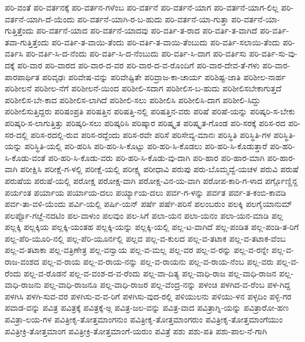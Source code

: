 ಪರಿ-ವಂತೆ
ಪರಿ-ವರ್ತನಕ್ಕೆ
ಪರಿ-ವರ್ತನ-ಗಳೆಂಬ
ಪರಿ-ವರ್ತನೆ
ಪರಿ-ವರ್ತನೆ-ಯಾಗ
ಪರಿ-ವರ್ತನೆ-ಯಾಗ-ಲಿಲ್ಲ
ಪರಿ-ವರ್ತನೆ-ಯಾಗಿ-ದೆ-ಯೆಂದು
ಪರಿ-ವರ್ತನೆ-ಯಾಗಿ-ರ-ಬ-ಹುದು
ಪರಿ-ವರ್ತನೆ-ಯಾ-ಗುತ್ತಾ
ಪರಿ-ವರ್ತನೆ-ಯಾ-ಗುತ್ತಿತ್ತೆಂದು
ಪರಿ-ವರ್ತನೆ-ಯಾದ
ಪರಿ-ವರ್ತನೆ-ಯಾದವು
ಪರಿ-ವರ್ತಿ-ತ-ರಾದ
ಪರಿ-ವರ್ತಿ-ತ-ವಾಗಿದೆ
ಪರಿ-ವರ್ತಿ-ತವಾ-ಗುತ್ತಿತ್ತೆಂದು
ಪರಿ-ವರ್ತಿ-ತ-ವಾಯಿ-ತೆಂದು
ಪರಿ-ವರ್ತಿ-ತ-ವಾಯಿ-ತೆಂಬುದು
ಪರಿ-ವರ್ತಿ-ಸಲಾಯಿ-ತೆಂದು
ಪರಿ-ವರ್ತಿಸಿ
ಪರಿ-ವರ್ತಿ-ಸಿ-ದ-ನೆಂದು
ಪರಿ-ವರ್ತಿ-ಸಿ-ದ-ನೆಂಬುದು
ಪರಿ-ವರ್ತಿ-ಸಿ-ದಾಗ
ಪರಿ-ವರ್ತಿಸು
ಪರಿ-ವರ್ತಿ-ಸು-ವು-ದಕ್ಕೆ
ಪರಿ-ವಾರ
ಪರಿ-ವಾರದ
ಪರಿ-ವಾರ-ದ-ವರ
ಪರಿ-ವಾರ-ದ-ವ-ರೊಂದಿಗೆ
ಪರಿ-ವಾರ-ದೇವ-ತೆ-ಗಳು
ಪರಿ-ವಾರ-ಪಾರಪಾರ್ಥಿತ
ಪರಿವೃಢಃ
ಪರಿವೇಷ-ವನ್ನು
ಪರಿವೇಷ್ಟಿತೇ
ಪರಿವ್ರಾಜ-ಕಾ-ಚಾರ್ಯ
ಪರಿಶಿಷ್ಟ-ಜಾತಿ
ಪರಿಶೀಲ-ನಾರ್ಹ
ಪರಿಶೀಲನೆ
ಪರಿಶೀಲ-ನೆಗೆ
ಪರಿಶೀಲನೆ-ಯಿಂದ
ಪರಿಶೀಲಿ-ಸದಾಗ
ಪರಿಶೀಲಿಸ-ಬ-ಹುದು
ಪರಿಶೀಲಿಸಬೇಕಾಗುತ್ತದೆ
ಪರಿಶೀಲಿಸ-ಬೇ-ಕಾದ
ಪರಿಶೀಲಿಸ-ಲಾಗಿದೆ
ಪರಿಶೀಲಿ-ಸಲು
ಪರಿಶೀಲಿಸಿ
ಪರಿಶೀಲಿಸಿ-ದಾಗ
ಪರಿಶೀಲಿ-ಸಿದ್ದು
ಪರಿಶೀಲಿಸುತ್ತಿದ್ದರು
ಪರಿಷಂಪ್ರತಿ
ಪರಿಷತ್ತಿನ
ಪರಿಷತ್ತಿ-ನಲ್ಲಿ
ಪರಿಷತ್ತಿನ-ವರು
ಪರಿಷೆ
ಪರಿಷೆ-ಯನ್ನು
ಪರಿಷ್ಕರಿ-ಸ-ಬೇಕು
ಪರಿಷ್ಕರಿ-ಸ-ಲಾಗುತ್ತಿತ್ತು
ಪರಿಷ್ಕರಿ-ಸಲು
ಪರಿಷ್ಕರಿಸಿ
ಪರಿಷ್ಕಾರ
ಪರಿಷ್ಕೃತ
ಪರಿಷ್ಕೃತ-ಗೊಂಡ
ಪರಿ-ಸರಕ್ಕೆ
ಪರಿಸ-ರದ
ಪರಿ-ಸರ-ದಲ್ಲಿ
ಪರಿಸ-ರದಲ್ಲಿ-ರುವ
ಪರಿಸ-ರದ್ದೆಂದು
ಪರಿಸ-ರವೇ
ಪರಿಸೆ
ಪರಿಸೇವ್ಯ-ಮಾನಃ
ಪರಿಸ್ಥಿತಿ
ಪರಿಸ್ಥಿತಿ-ಗಳ
ಪರಿಸ್ಥಿತಿ-ಯನ್ನು
ಪರಿಸ್ಥಿತಿ-ಯಲ್ಲಿ
ಪರಿ-ಹರಿಸಿ
ಪರಿ-ಹರಿ-ಸಿ-ಕೊಟ್ಟು
ಪರಿ-ಹರಿ-ಸಿ-ಕೊಡಲು
ಪರಿ-ಹರಿ-ಸಿ-ಕೊಡುತ್ತಾರೆ
ಪರಿ-ಹರಿ-ಸಿ-ಕೊಡು-ವಂತೆ
ಪರಿ-ಹರಿ-ಸಿ-ಕೊಡು-ವರು
ಪರಿ-ಹರಿ-ಸಿ-ಕೊಡು-ವು-ದಾಗಿ
ಪರಿ-ಹಾರ
ಪರಿ-ಹಾರ-ಮಾಗಿ
ಪರಿ-ಹಾರ-ವಾಗಿ
ಪರೀಕ್ಷಿಸಿ
ಪರೀಕ್ಷೆ-ಗ-ಳಲ್ಲಿ
ಪರೀಕ್ಷೆ-ಯಲ್ಲಿ
ಪರೀಕ್ಷ್ಯ
ಪರೀಧಾವಿ
ಪರುಪು
ಪರು-ಬೊಮ್ಮವ್ವೆ-ಯಚಳ
ಪರುವಿ
ಪರುಷೆ
ಪರುಷೆಯ
ಪರುಷೆ-ಯಲ್ಲಿ
ಪರೋಕ್ಷ
ಪರೋಕ್ಷ-ವಾಗಿ
ಪರೋಕ್ಷ-ವಿನ-ಯ-ವಾಗಿ
ಪರೋಪ-ಕಾರಿ-ಗ-ಳಾದ
ಪರ್ಗ್ಗೊಣ್ಣಿನ್ದ
ಪರ್ಯಂತ
ಪರ್ಯಾಯ
ಪರ್ಯಾಯ-ದಲು
ಪರ್ಯ್ಯಾಯ-ದಲು
ಪರ್ವ-ಗ-ಳನ್ನು
ಪರ್ವತ
ಪರ್ವ-ತ-ಕಂಬಿ-ಕಾವಡಿ
ಪರ್ವ-ತಾ-ವಳಿ-ಯೆಂದು
ಪರ್ವಿ-ಯಲ್ಲಿ
ಪರ್ಷಿ-ಯನ್
ಪರ್ಷೆ
ಪರ್ಷೆ-ಪರಿಸೆ
ಪಲಂಬರುಂ
ಪಲಕ್ಕಿ
ಪಲಗೈಯಾನುಮ್
ಪಲರ್ಪ್ಪೊ-ಗೞ್ದೆ-ನದಟಿಂ
ಪಲ-ವಾಳುಂ
ಪಲವುಂ
ಪಲ-ಸಿಗೆ
ಪಲಾ-ಯನ
ಪಲಾ-ಯನಂ
ಪಲಾ-ಯನ-ಮಾಡಿ
ಪಲ್ಲ
ಪಲ್ಲಕ್ಕಿ
ಪಲ್ಲಕ್ಕಿಯ
ಪಲ್ಲಕ್ಕಿ-ಯಂತಹ
ಪಲ್ಲಕ್ಕಿ-ಯನ್ನು
ಪಲ್ಲಕ್ಕಿ-ಯಲ್ಲಿ
ಪಲ್ಲ-ಟ-ವಾಗಿದೆ
ಪಲ್ಲ-ಪಂಡಿತ
ಪಲ್ಲ-ಪಂಡಿ-ತ-ರಿಗೆ
ಪಲ್ಲ-ಪೆರಿ-ಯೂರಿ-ನಲ್ಲಿ
ಪಲ್ಲ-ಪೆರಿ-ಯೂರ್ನಲ್ಲಿ
ಪಲ್ಲವ
ಪಲ್ಲ-ವ-ಕುಲದ
ಪಲ್ಲ-ವ-ತಟಾಕ
ಪಲ್ಲ-ವ-ತಟಾಕ-ವೆಂಬ
ಪಲ್ಲ-ವ-ತಟಾಕಾ
ಪಲ್ಲ-ವತ್ರಿಣೇತ್ರ
ಪಲ್ಲ-ವನ್ವಾಯ
ಪಲ್ಲ-ವ-ಮಲ್ಲ
ಪಲ್ಲ-ವರ
ಪಲ್ಲ-ವ-ರನ್ನು
ಪಲ್ಲ-ವ-ರನ್ನೇ
ಪಲ್ಲ-ವ-ರಾಜ-ವಂಶದ
ಪಲ್ಲ-ವ-ರಾಯ
ಪಲ್ಲ-ವ-ರಾಯ-ನನ್ನು
ಪಲ್ಲ-ವ-ರಾಯನು
ಪಲ್ಲ-ವ-ರಾಯ-ನೆಂಬ
ಪಲ್ಲ-ವರು
ಪಲ್ಲ-ವ-ರೆಂದು
ಪಲ್ಲ-ವ-ರೊಡನೆ
ಪಲ್ಲ-ವ-ವಂಶ-ದ-ವ-ರೆಂದು
ಪಲ್ಲ-ವಾ-ದಿತ್ಯ
ಪಲ್ಲ-ವಾಧಿ-ರಾಜ
ಪಲ್ಲ-ವಾಧಿ-ರಾಜನ
ಪಲ್ಲ-ವಾಧಿ-ರಾಜನು
ಪಲ್ಲ-ವಾಧಿ-ರಾಜನೂ
ಪಲ್ಲ-ವಾಧಿ-ರಾಜರ
ಪಲ್ಲ-ವೆಂದ್ರ-ನನ್ನು
ಪಳಂಚಿ
ಪಳಗಿದ-ವ-ರೆಂಬ
ಪಳ-ಗಿದ್ದ
ಪಳಗಿಸಿ
ಪಳಗಿ-ಸುವ-ವರ
ಪಳಗಿಸು-ವ-ವ-ರಿಗೆ
ಪಳಗಿಸು-ವುದ-ರಲ್ಲಿ
ಪಳಿಯುಲನು
ಪಳಿಯು-ಳನ
ಪಳ್ಳದಿಂ
ಪಳ್ಳಿ-ಗರ
ಪವಾಡ-ವನ್ನು
ಪವಿತ್ರ
ಪವಿತ್ರಕ್ಕೆ
ಪವಿತ್ರಕ್ಕೆ-ಅ್ಗ
ಪವಿತ್ರ-ಜಲ-ವನ್ನು
ಪವಿತ್ರ-ವಾದ
ಪವಿತ್ರಾಗ್ನಿ-ಯನ್ನು
ಪವಿತ್ರಾರೋ-ಹಣ
ಪವಿತ್ರಾ-ಲಯ-ಗಳ
ಪವಿತ್ರೀಕೃ-ತೋತ್ತಮಾಂಗನುಂ
ಪವಿತ್ರೀಕೃ-ತೋತ್ತಮಾಂಗರುಂ
ಪವಿತ್ರೀಕೃ-ತೋತ್ತಮಾಂಗೆಯುಂ
ಪವಿತ್ರೀಕ್ರಿ-ತೋತ್ತಮಾಂಗ
ಪವಿತ್ರೀಕ್ರಿ-ತೋತ್ತಮಾಂಗೆ-ಯರುಂ
ಪವಿತ್ರೆ
ಪಶು
ಪಶು-ಪತಿ
ಪಶು-ಪಾಲ-ನೆ-ಗಾಗಿ

